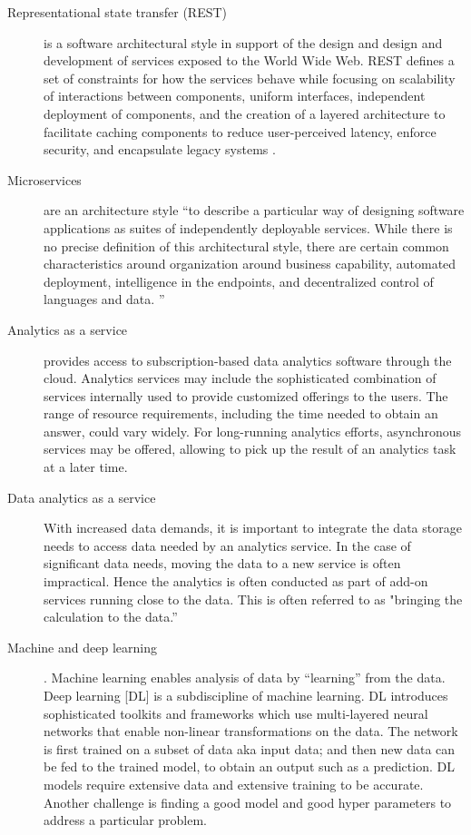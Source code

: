 \begin{description}
\item[Representational state transfer (REST)]
     is a software architectural style in support of the design and 
     design and development of services exposed to the  World Wide
     Web. REST defines a set of 
     constraints for how the services behave while focusing on 
     scalability of interactions between components, uniform
     interfaces, independent deployment of components, and the
     creation of a layered architecture to facilitate caching
     components to reduce user-perceived latency, enforce security,
     and encapsulate legacy systems \cite{www-rest}.

\item[Microservices]
     are an architecture style ``to describe a particular way of
     designing software applications as suites of independently
     deployable services. While there is no precise definition of this
     architectural style, there are certain common characteristics
     around organization around business capability, automated
     deployment, intelligence in the endpoints, and decentralized
     control of languages and data. \cite{www-microservices}''

\item[Analytics as a service]
     provides access to subscription-based data analytics software
     through the cloud. Analytics services may include the
     sophisticated combination of services internally used to provide
     customized offerings to the users. The range of resource
     requirements, including the time needed to obtain an answer, could
     vary widely. For long-running analytics efforts, asynchronous
     services may be offered, allowing to pick up the result of an
     analytics task at a later time.

\item[Data analytics as a service]
     With increased data demands, it is important to integrate the data
     storage needs to access data needed by an analytics service. In
     the case of significant data needs, moving the data
     to a new service is often impractical. Hence the analytics is often conducted as part
     of add-on services running close to the data. This is often referred to as "bringing the calculation to the data.''

\item[Machine and deep learning].
     Machine learning enables analysis of data by  ``learning''
     from the data. Deep learning [DL] is a subdiscipline of machine
     learning. DL introduces sophisticated toolkits and frameworks which use multi-layered neural networks that enable non-linear
     transformations on the data. The network is first trained on
     a subset of data aka input data; and then new data can be fed to the trained model, to
     obtain an output such as a prediction. DL models require extensive data and
     extensive training to be accurate. Another challenge is finding a good model and good hyper parameters to address a particular
     problem.


\end{description}

